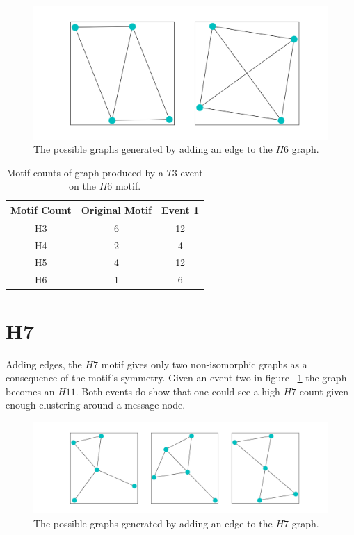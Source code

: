 \begin{figure}[!ht]
    \includegraphics[width=14cm]{Images/H6_T3_evolution.png}
    \centering
    \caption{The possible graphs generated by adding an edge to the $H6$ graph.}
\end{figure}

\begin{table}
    \centering
    \begin{tabular}{||c c c ||} 
    \hline
    Motif Count & Original Motif & Event 1  \\ [0.5ex] 
    \hline\hline
    H3 & 6 & 12 \\ 
    \hline
    H4 & 2 & 4 \\
    \hline
    H5 & 4 & 12 \\
    \hline
    H6 & 1 & 6 \\
    \hline
    \hline
   \end{tabular}
   \caption{Motif counts of graph produced by a $T3$ event on the $H6$ motif.}
\end{table}

\section{H7}
Adding edges, the $H7$ motif gives only two non-isomorphic graphs as 
a consequence of the motif's symmetry. Given an event two in figure ~\ref{fig:H7T3} the graph becomes
an $H11$. Both events do show that one could see a high $H7$ count given enough
clustering around a message node. 
 
\begin{figure}[!ht]
    \includegraphics[width=16cm]{Images/H7_T3_evolution.png}
    \centering
    \caption{The possible graphs generated by adding an edge to the $H7$ graph.}
    \label{fig:H7T3}
\end{figure}

